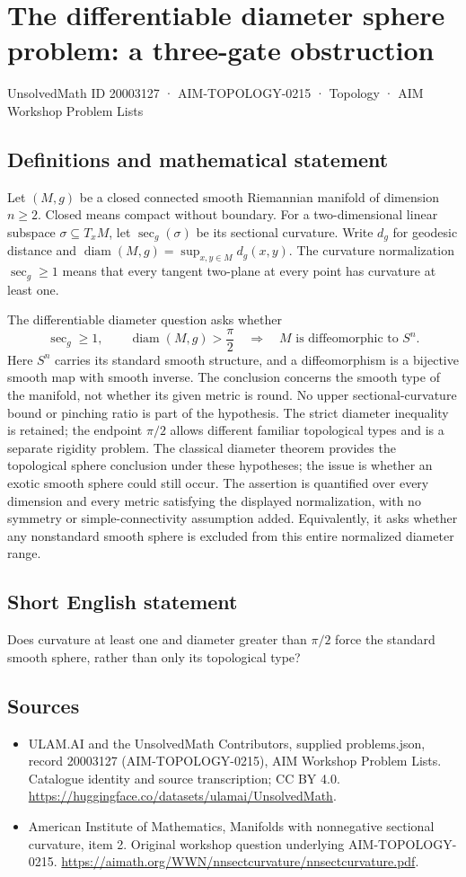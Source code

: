 \documentclass[11pt,a4paper]{article}
\begin{document}
\section*{The differentiable diameter sphere problem: a three-gate obstruction}\label{20003127}
{\small UnsolvedMath ID 20003127 · AIM-TOPOLOGY-0215 · Topology · AIM Workshop Problem Lists}
\subsection{Definitions and mathematical statement}
Let $(M,g)$ be a closed connected smooth Riemannian manifold of dimension $n\geq2$.
Closed means compact without boundary.
For a two-dimensional linear subspace $\sigma\subseteq T_xM$, let $\sec_g(\sigma)$ be its sectional curvature.
Write $d_g$ for geodesic distance and
$\operatorname{diam}(M,g)=\sup_{x,y\in M}d_g(x,y)$.
The curvature normalization $\sec_g\geq1$ means that every tangent two-plane at every point has curvature at least one.

The differentiable diameter question asks whether
\[
 \sec_g\geq1,\qquad
 \operatorname{diam}(M,g)>\frac\pi2
 \quad\Longrightarrow\quad
 M\text{ is diffeomorphic to }S^n.
\]
Here $S^n$ carries its standard smooth structure, and a diffeomorphism is a bijective smooth map with smooth inverse.
The conclusion concerns the smooth type of the manifold, not whether its given metric is round.
No upper sectional-curvature bound or pinching ratio is part of the hypothesis.
The strict diameter inequality is retained; the endpoint $\pi/2$ allows different familiar topological types and is a separate rigidity problem.
The classical diameter theorem provides the topological sphere conclusion under these hypotheses; the issue is whether an exotic smooth sphere could still occur.
The assertion is quantified over every dimension and every metric satisfying the displayed normalization, with no symmetry or simple-connectivity assumption added.
Equivalently, it asks whether any nonstandard smooth sphere is excluded from this entire normalized diameter range.
\subsection{Short English statement}
Does curvature at least one and diameter greater than $\pi/2$ force the standard smooth sphere, rather than only its topological type?
\subsection{Sources}
\begin{itemize}
\item[S1] ULAM.AI and the UnsolvedMath Contributors, supplied problems.json, record 20003127 (AIM-TOPOLOGY-0215), AIM Workshop Problem Lists. Catalogue identity and source transcription; CC BY 4.0.
\url{https://huggingface.co/datasets/ulamai/UnsolvedMath}.
\item[S2] American Institute of Mathematics, Manifolds with nonnegative sectional curvature, item 2. Original workshop question underlying AIM-TOPOLOGY-0215.
\url{https://aimath.org/WWN/nnsectcurvature/nnsectcurvature.pdf}.
\end{itemize}
\end{document}
